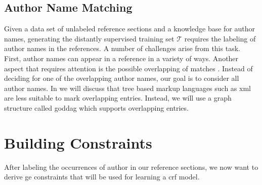 \subsection{Author Name Matching}\label{subsec:ae-author-name-matching}

Given a data set of unlabeled reference sections and a knowledge base for author names, generating the distantly supervised training set $\mathcal{T}$ requires the labeling of author names in the references.
A number of challenges arise from this task.
First, author names can appear in a reference in a variety of ways.
Another aspect that requires attention is the possible overlapping of matches .
Instead of deciding for one of the overlapping author names, our goal is to consider all author names.
In  we will discuss that tree based markup languages such as \gls{xml} are less suitable to mark overlapping entries.
Instead, we will use a graph structure called \gls{goddag} which supports overlapping entries.

\section{Building  Constraints}\label{sec:ae-training-crfs}

After labeling the occurrences of author in our reference sections, we now want to derive \gls{ge} constraints that will be used for learning a \gls{crf} model.


